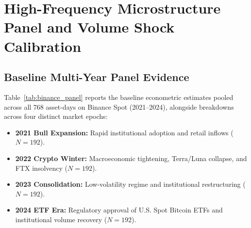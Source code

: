 \documentclass[12pt]{article}
\theoremstyle{definition}
\theoremstyle{remark}
\begin{document}
\section{High-Frequency Microstructure Panel and Volume Shock Calibration}
\label{sec:baseline_natural_exp}

\subsection{Baseline Multi-Year Panel Evidence}
Table~\ref{tab:binance_panel} reports the baseline econometric estimates pooled across all 768 asset-days on Binance Spot (2021--2024), alongside breakdowns across four distinct market epochs:
\begin{itemize}
    \item \textbf{2021 Bull Expansion:} Rapid institutional adoption and retail inflows ($N = 192$).
    \item \textbf{2022 Crypto Winter:} Macroeconomic tightening, Terra/Luna collapse, and FTX insolvency ($N = 192$).
    \item \textbf{2023 Consolidation:} Low-volatility regime and institutional restructuring ($N = 192$).
    \item \textbf{2024 ETF Era:} Regulatory approval of U.S. Spot Bitcoin ETFs and institutional volume recovery ($N = 192$).
\end{itemize}

\begin{table}[htbp]
\centering
\caption{\textbf{Baseline High-Frequency Feedback Panel (Binance Spot 2021--2024).}
Estimated feedback parameter $\hat{Q}$, 30-lag memory-purged feedback $\hat{Q}_{30}$, closed-loop persistence $\hat{S}$, loop ratio $\hat{\mathcal{L}}$, minimum-distance Lyapunov estimate $Q_{\text{MD}}$, and Rigobon heteroskedasticity estimate $Q_{\text{Rig}}$ across 8 liquid cryptocurrency pairs evaluated on 768 daily sessions ($66.3 \times 10^6$ one-second transitions). 95\% clustered confidence intervals in brackets.}
\label{tab:binance_panel}
\resizebox{\textwidth}{!}{%
%
}
\end{table}
\end{document}

